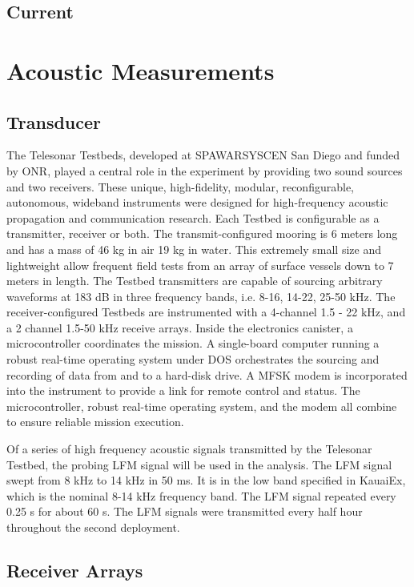 \subsection{Current}
\section{Acoustic Measurements}
\subsection{Transducer}
The Telesonar Testbeds, developed at SPAWARSYSCEN San Diego and
funded by ONR, played a central role in the experiment by providing
two sound sources and two receivers.  These unique, high-fidelity,
modular, reconfigurable, autonomous, wideband instruments were
designed for high-frequency acoustic propagation and communication
research.  Each Testbed is configurable as a transmitter, receiver
or both.  The transmit-configured mooring is 6 meters long and has a
mass of 46 kg in air 19 kg in water.  This extremely small size and
lightweight allow frequent field tests from an array of surface
vessels down to 7 meters in length. The Testbed transmitters are
capable of sourcing arbitrary waveforms at 183 dB in three frequency
bands, i.e. 8-16, 14-22, 25-50 kHz. The receiver-configured Testbeds
are instrumented with a 4-channel 1.5 - 22 kHz, and a 2 channel
1.5-50 kHz receive arrays.  Inside the electronics canister, a
microcontroller coordinates the mission.  A single-board computer
running a robust real-time operating system under DOS orchestrates
the sourcing and recording of data from and to a hard-disk drive.  A
MFSK modem is incorporated into the instrument to provide a link for
remote control and status.  The microcontroller, robust real-time
operating system, and the modem all combine to ensure reliable
mission execution.

Of a series of high frequency acoustic signals transmitted by the
Telesonar Testbed, the probing LFM signal will be used in the
analysis. The LFM signal swept from 8 kHz to 14 kHz in 50 ms. It is
in the low band specified in KauaiEx, which is the nominal 8-14 kHz
frequency band. The LFM signal repeated every 0.25 s for about 60 s.
The LFM signals were transmitted every half hour throughout the
second deployment.
\subsection{Receiver Arrays}
